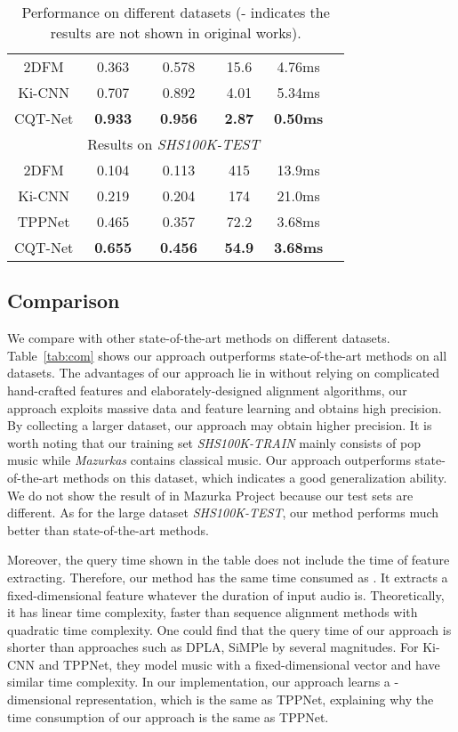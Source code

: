 \documentclass{article}
\newcommand{\tabref}[1]{\mbox{Table~\ref{#1}}}
\begin{document}
\begin{table}[H]
\begin{tabular}{cccccc}
      2DFM \cite{bertin2012large} & 0.363 & 0.578 & 15.6 & 4.76ms  \\
      Ki-CNN \cite{xu2018key}& 0.707 & 0.892 & 4.01 & 5.34ms \\ 
      CQT-Net & \textbf{0.933} & \textbf{0.956} & \textbf{2.87} & \textbf{0.50ms} \\
      \hline
      &\multicolumn{3}{c}{Results on \textit{SHS100K-TEST}} \\
      \hline
      2DFM \cite{bertin2012large} & 0.104 & 0.113 & 415 & 13.9ms  \\
      Ki-CNN \cite{xu2018key}& 0.219 & 0.204 & 174 & 21.0ms \\ 
      TPPNet \cite{yu2019temporal} & 0.465 & 0.357 & 72.2 & 3.68ms \\
      CQT-Net & \textbf{0.655} & \textbf{0.456} & \textbf{54.9} & \textbf{3.68ms} \\ 
      \bottomrule
  \end{tabular}
  \caption{Performance on different datasets (- indicates the results are not shown in original works).}
  \end{table}

\subsection{Comparison}
We compare with other state-of-the-art methods on different datasets. \tabref{tab:com} shows our approach outperforms state-of-the-art methods on all datasets. The advantages of our approach lie in without relying on complicated hand-crafted features and elaborately-designed alignment algorithms, our approach exploits massive data and feature learning and obtains high precision. By collecting a larger dataset, our approach may obtain higher precision. It is worth noting that our training set \textit{SHS100K-TRAIN} mainly consists of pop music while \textit{Mazurkas} contains classical music. Our approach outperforms state-of-the-art methods on this dataset, which indicates a good generalization ability. We do not show the result of \cite{grosche2012structure} in Mazurka Project because our test sets are different. As for the large dataset \textit{SHS100K-TEST}, our method performs much better than state-of-the-art methods.

Moreover, the query time shown in the table does not include the time of feature extracting. Therefore, our method has the same time consumed as \cite{yu2019temporal}. It extracts a fixed-dimensional feature whatever the duration of input audio is. Theoretically, it has linear time complexity, faster than sequence alignment methods with quadratic time complexity. One could find that the query time of our approach is shorter than approaches such as DPLA, SiMPle by several magnitudes. For Ki-CNN and TPPNet, they model music with a fixed-dimensional vector and have similar time complexity. In our implementation, our approach learns a -dimensional representation, which is the same as TPPNet, explaining why the time consumption of our approach is the same as TPPNet.
\end{document}
